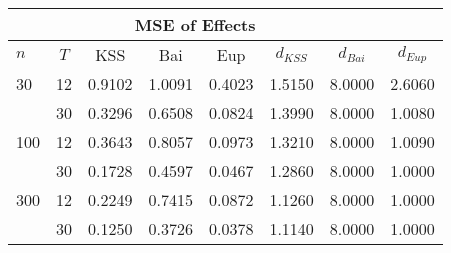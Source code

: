 \begin{tabular}{lccccccc} 
\hline \multicolumn{7}{c}{MSE of Effects} \\ \hline 
$n$ & $T$ & KSS & Bai & Eup & $d_{KSS}$ & $d_{Bai}$ & $d_{Eup}$ \\
\hline
30 & 12 &  0.9102  &  1.0091  &  0.4023  &  1.5150  &  8.0000  &  2.6060  \\
& 30 &  0.3296  &  0.6508  &  0.0824  &  1.3990  &  8.0000  &  1.0080  \\
100 & 12 &  0.3643  &  0.8057  &  0.0973  &  1.3210  &  8.0000  &  1.0090  \\
& 30 &  0.1728  &  0.4597  &  0.0467  &  1.2860  &  8.0000  &  1.0000  \\
300 & 12 &  0.2249  &  0.7415  &  0.0872  &  1.1260  &  8.0000  &  1.0000  \\
& 30 &  0.1250  &  0.3726  &  0.0378  &  1.1140  &  8.0000  &  1.0000  \\
\end{tabular} 
